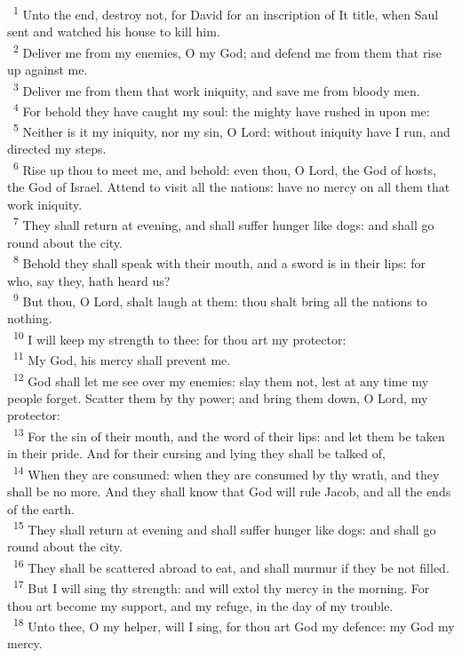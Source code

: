 \documentclass[a5paper,12pt]{article}
\begin{document}
\begin{multicols*}{2}
~\textsuperscript{1} Unto the end, destroy not, for David for an inscription of It title, when Saul sent and watched his house to kill him.\\
~\textsuperscript{2} Deliver me from my enemies, O my God; and defend me from them that rise up against me.\\
~\textsuperscript{3} Deliver me from them that work iniquity, and save me from bloody men.\\
~\textsuperscript{4} For behold they have caught my soul: the mighty have rushed in upon me:\\
~\textsuperscript{5} Neither is it my iniquity, nor my sin, O Lord: without iniquity have I run, and directed my steps.\\
~\textsuperscript{6} Rise up thou to meet me, and behold: even thou, O Lord, the God of hosts, the God of Israel. Attend to visit all the nations: have no mercy on all them that work iniquity.\\
~\textsuperscript{7} They shall return at evening, and shall suffer hunger like dogs: and shall go round about the city.\\
~\textsuperscript{8} Behold they shall speak with their mouth, and a sword is in their lips: for who, say they, hath heard us?\\
~\textsuperscript{9} But thou, O Lord, shalt laugh at them: thou shalt bring all the nations to nothing.\\
~\textsuperscript{10} I will keep my strength to thee: for thou art my protector:\\
~\textsuperscript{11} My God, his mercy shall prevent me.\\
~\textsuperscript{12} God shall let me see over my enemies: slay them not, lest at any time my people forget. Scatter them by thy power; and bring them down, O Lord, my protector:\\
~\textsuperscript{13} For the sin of their mouth, and the word of their lips: and let them be taken in their pride. And for their cursing and lying they shall be talked of,\\
~\textsuperscript{14} When they are consumed: when they are consumed by thy wrath, and they shall be no more. And they shall know that God will rule Jacob, and all the ends of the earth.\\
~\textsuperscript{15} They shall return at evening and shall suffer hunger like dogs: and shall go round about the city.\\
~\textsuperscript{16} They shall be scattered abroad to eat, and shall murmur if they be not filled.\\
~\textsuperscript{17} But I will sing thy strength: and will extol thy mercy in the morning. For thou art become my support, and my refuge, in the day of my trouble.\\
~\textsuperscript{18} Unto thee, O my helper, will I sing, for thou art God my defence: my God my mercy.\\


\end{multicols*}
\end{document}
